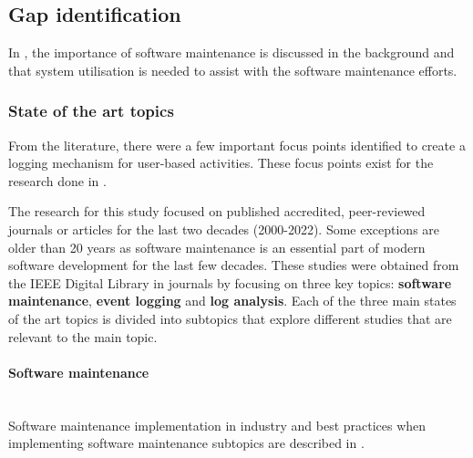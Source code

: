 \clearpage

\subsection{Gap identification}
In , the importance of software maintenance is discussed in the background and that system utilisation is needed to assist with the software maintenance efforts.

\subsubsection{State of the art topics}
From the literature, there were a few important focus points identified to create a logging mechanism for user-based activities. These focus points exist for the research done in .\par The research for this study focused on published accredited, peer-reviewed journals or articles for the last two decades (2000-2022). Some exceptions are older than 20 years as software maintenance is an essential part of modern software development for the last few decades. These studies were obtained from the IEEE Digital Library in journals by focusing on three key topics: \textbf{software maintenance}, \textbf{event logging} and \textbf{log analysis}. Each of the three main states of the art topics is divided into subtopics that explore different studies that are relevant to the main topic.

\paragraph{Software maintenance} \leavevmode\\
Software maintenance implementation in industry and best practices when implementing software maintenance subtopics are described in .

